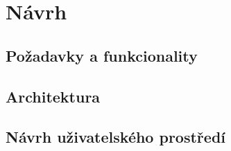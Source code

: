 \chapter{Návrh}

\section{Požadavky a funkcionality}

\section{Architektura}

\section{Návrh uživatelského prostředí}